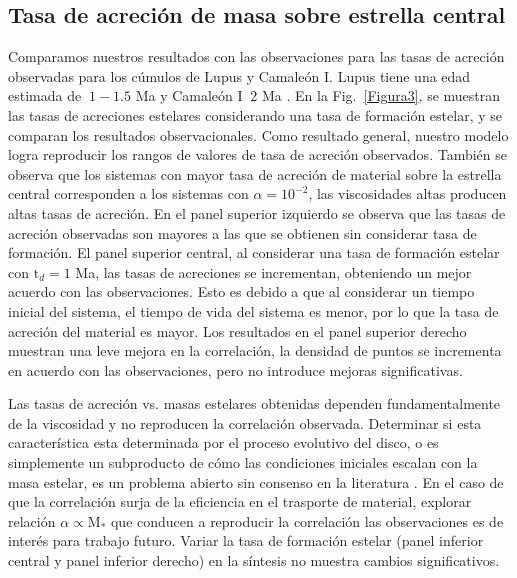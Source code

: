 \documentclass[baaa]{baaa}
\begin{document}
\subsection{Tasa de acreción de masa sobre estrella central}
Comparamos nuestros resultados con las observaciones para las tasas de acreción observadas para los cúmulos de Lupus y Camaleón I. Lupus tiene una edad estimada de $\mathrm{~}1-1.5$ Ma y Camaleón I $\mathrm{~}2$ Ma \citep{manara2013}. 
En la Fig.~\ref{Figura3}, se muestran las tasas de acreciones estelares considerando una tasa de formación estelar, y se comparan los resultados observacionales. Como resultado general, nuestro modelo logra reproducir los rangos de valores de tasa de acreción observados. También se observa que los sistemas con mayor tasa de acreción de material sobre la estrella central corresponden a los sistemas con $\alpha=10^{-2}$, las viscosidades altas producen altas tasas de acreci\'on.
En el panel superior izquierdo se observa que las tasas de acreción observadas son mayores a las que se obtienen sin considerar tasa de formación. El panel superior central, al considerar una tasa de formación estelar con $\mathrm{t}_{d}=1$ Ma, las tasas de acreciones se incrementan, obteniendo un mejor acuerdo con las observaciones. Esto es debido a que al considerar un tiempo inicial del sistema, el tiempo de vida del sistema es menor, por lo que la tasa de acreción del material es mayor. Los resultados en el panel superior derecho muestran una leve mejora en la correlación, la densidad de puntos se incrementa en acuerdo con las observaciones, pero no introduce mejoras significativas.

Las tasas de acreción vs. masas estelares obtenidas dependen fundamentalmente de la viscosidad y no reproducen la correlación observada. Determinar si esta característica esta determinada por el proceso evolutivo del disco, o es simplemente un subproducto de cómo las condiciones iniciales escalan con la masa estelar, es un problema abierto sin consenso en la literatura \cite{2017Ecol, manara2023ASPC}. En el caso de que la correlación surja de la eficiencia en el trasporte de material, explorar relación $\alpha  \propto \mathrm{M}_{*}$ que conducen a reproducir la correlación 
las observaciones es de interés para trabajo futuro. Variar la tasa de formación estelar (panel inferior central y panel inferior derecho) en la síntesis no muestra cambios significativos.
\end{document}
